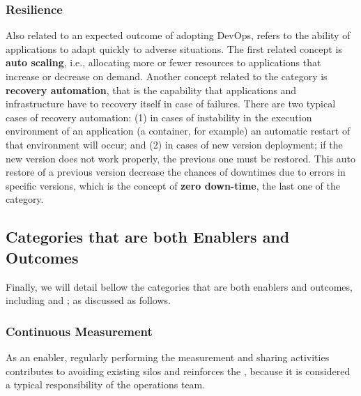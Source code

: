 \subsubsection{Resilience}

Also related to an expected outcome of adopting DevOps,  refers
to the ability of applications to adapt quickly to adverse situations.
The first related concept is \textbf{auto scaling}, i.e.,
allocating more or fewer resources to applications that increase or
decrease on demand. Another concept related to
the  category is \textbf{recovery automation}, that is
the capability that applications and infrastructure have to recovery itself in case of
failures. There are two typical cases of recovery automation: (1) in cases
of instability in the execution environment of an application (a
container, for example) an automatic restart of that environment will occur; and (2) in
cases of new version deployment; if the new version does not work properly, the
previous one must be restored. This auto restore of a previous version
decrease the chances of downtimes due to errors in specific versions, which
is the concept of \textbf{zero down-time}, the last one of the  category.

\subsection{Categories that are both Enablers and Outcomes}

Finally, we will detail bellow the categories that are both enablers
and outcomes, including 
and ; as discussed as follows.

\subsubsection{Continuous Measurement}

As an enabler, regularly performing the measurement and sharing activities
contributes to avoiding existing silos and reinforces the \cc, because it is
considered a typical responsibility of the operations team.


